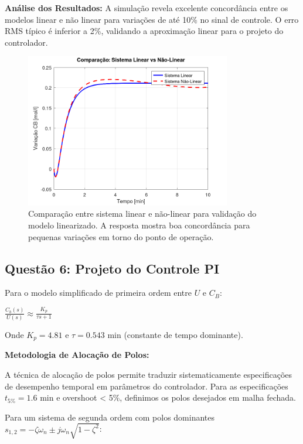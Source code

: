 \documentclass[a4paper,12pt]{article}
\begin{document}
\textbf{Análise dos Resultados:}
A simulação revela excelente concordância entre os modelos linear e não linear para variações de até 10\% no sinal de controle. O erro RMS típico é inferior a 2\%, validando a aproximação linear para o projeto do controlador.

\begin{figure}[H]
    \centering
    \includegraphics[width=0.8\textwidth]{figura_questao5_linear_vs_naolinear.png}
    \caption{Comparação entre sistema linear e não-linear para validação do modelo linearizado. A resposta mostra boa concordância para pequenas variações em torno do ponto de operação.}
    \label{fig:linear_vs_naolinear}
\end{figure}

\subsection{Questão 6: Projeto do Controle PI}

Para o modelo simplificado de primeira ordem entre $U$ e $C_B$:

$\frac{C_b(s)}{U(s)} \approx \frac{K_p}{\tau s + 1}$

Onde $K_p = 4.81$ e $\tau = 0.543$ min (constante de tempo dominante).

\textbf{Metodologia de Alocação de Polos:}

A técnica de alocação de polos permite traduzir sistematicamente especificações de desempenho temporal em parâmetros do controlador. Para as especificações $t_{5\%} = 1.6$ min e overshoot < 5\%, definimos os polos desejados em malha fechada.

Para um sistema de segunda ordem com polos dominantes $s_{1,2} = -\zeta\omega_n \pm j\omega_n\sqrt{1-\zeta^2}$:
\end{document}
